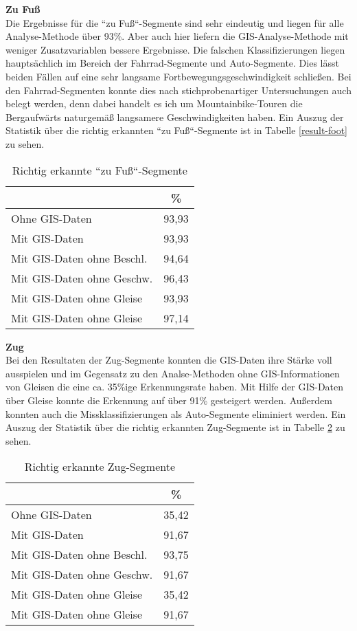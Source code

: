 \textbf{Zu Fuß} \\
Die Ergebnisse für die ``zu Fuß``-Segmente sind sehr eindeutig und liegen für alle Analyse-Methode über 93\%.  Aber auch hier liefern die GIS-Analyse-Methode mit weniger Zusatzvariablen bessere Ergebnisse. Die falschen Klassifizierungen liegen hauptsächlich im Bereich der Fahrrad-Segmente und Auto-Segmente. Dies lässt beiden Fällen auf eine sehr langsame Fortbewegungsgeschwindigkeit schließen. Bei den Fahrrad-Segmenten konnte dies nach stichprobenartiger Untersuchungen auch belegt werden, denn dabei handelt es ich um Mountainbike-Touren die Bergaufwärts naturgemäß langsamere Geschwindigkeiten haben. Ein Auszug der Statistik über die richtig erkannten ``zu Fuß``-Segmente ist in Tabelle \ref{result-foot} zu sehen.

\begin{table}[h]
\centering
\begin{tabular}{|l|c|}
\hline
 & \% \\ \hline
Ohne GIS-Daten & 93,93 \\ \hline
Mit GIS-Daten & 93,93 \\ \hline
Mit GIS-Daten ohne Beschl. & 94,64 \\ \hline
Mit GIS-Daten ohne Geschw. & 96,43 \\ \hline
Mit GIS-Daten ohne Gleise & 93,93 \\ \hline
Mit GIS-Daten ohne Gleise & 97,14 \\ \hline
\end{tabular}
\caption{Richtig erkannte ``zu Fuß``-Segmente}
\label{resultat-foot}
\end{table}

\textbf{Zug} \\
Bei den Resultaten der Zug-Segmente konnten die GIS-Daten ihre Stärke voll ausspielen und im Gegensatz zu den Analse-Methoden ohne GIS-Informationen von Gleisen die eine ca. 35\%ige Erkennungsrate haben. Mit Hilfe der GIS-Daten über Gleise konnte die Erkennung auf über 91\% gesteigert werden. Außerdem konnten auch die Missklassifizierungen als Auto-Segmente eliminiert werden. Ein Auszug der Statistik über die richtig erkannten Zug-Segmente ist in Tabelle \ref{result-train} zu sehen.

\begin{table}[h]
\centering
\begin{tabular}{|l|c|}
\hline
 & \% \\ \hline
Ohne GIS-Daten & 35,42 \\ \hline
Mit GIS-Daten & 91,67 \\ \hline
Mit GIS-Daten ohne Beschl. & 93,75 \\ \hline
Mit GIS-Daten ohne Geschw. & 91,67 \\ \hline
Mit GIS-Daten ohne Gleise & 35,42 \\ \hline
Mit GIS-Daten ohne Gleise & 91,67 \\ \hline
\end{tabular}
\caption{Richtig erkannte Zug-Segmente}
\label{result-train}
\end{table}


